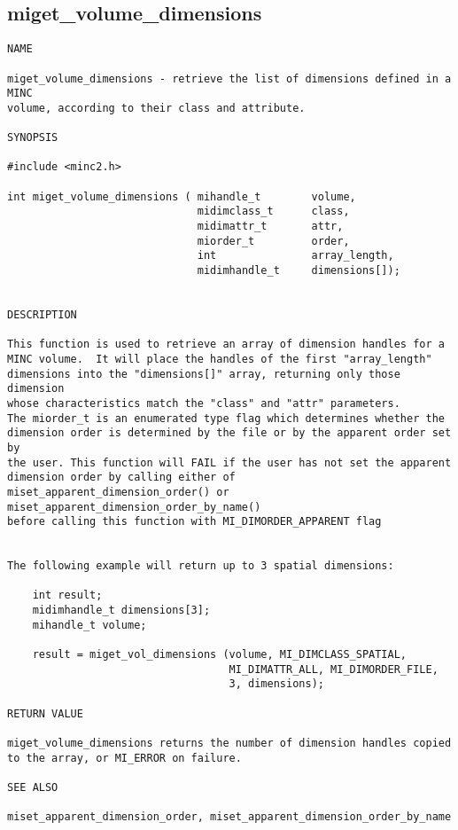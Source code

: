 \documentclass{article}
\begin{document}
\subsection{miget\_volume\_dimensions}
\begin{verbatim}
NAME  

miget_volume_dimensions - retrieve the list of dimensions defined in a MINC 
volume, according to their class and attribute.

SYNOPSIS

#include <minc2.h>

int miget_volume_dimensions ( mihandle_t        volume, 
                              midimclass_t      class, 
                              midimattr_t       attr, 
                              miorder_t         order,
                              int               array_length,
                              midimhandle_t     dimensions[]);
                              

DESCRIPTION

This function is used to retrieve an array of dimension handles for a
MINC volume.  It will place the handles of the first "array_length"
dimensions into the "dimensions[]" array, returning only those dimension
whose characteristics match the "class" and "attr" parameters. 
The miorder_t is an enumerated type flag which determines whether the
dimension order is determined by the file or by the apparent order set by 
the user. This function will FAIL if the user has not set the apparent 
dimension order by calling either of 
miset_apparent_dimension_order() or miset_apparent_dimension_order_by_name()
before calling this function with MI_DIMORDER_APPARENT flag


The following example will return up to 3 spatial dimensions:

    int result;
    midimhandle_t dimensions[3];
    mihandle_t volume;

    result = miget_vol_dimensions (volume, MI_DIMCLASS_SPATIAL, 
                                   MI_DIMATTR_ALL, MI_DIMORDER_FILE, 
                                   3, dimensions);

RETURN VALUE

miget_volume_dimensions returns the number of dimension handles copied 
to the array, or MI_ERROR on failure.

SEE ALSO

miset_apparent_dimension_order, miset_apparent_dimension_order_by_name
\end{verbatim}
\end{document}

